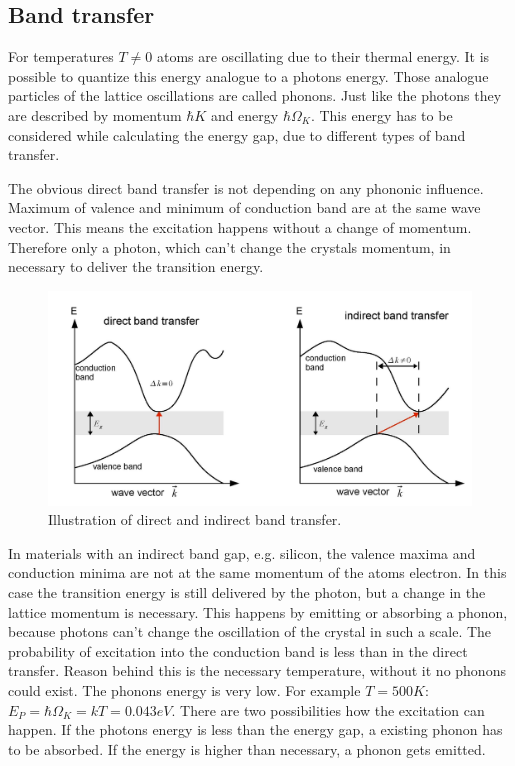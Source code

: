 \documentclass[]{article}
\begin{document}
\subsection{Band transfer}
For temperatures $T\neq 0$ atoms are oscillating due to their thermal energy. It is possible to quantize this energy analogue to a photons energy. Those analogue particles of the lattice oscillations are called phonons. Just like the photons they are described by momentum $\hbar K$ and energy $\hbar \Omega_K$. This energy has to be considered while calculating the energy gap, due to different types of band transfer.

The obvious direct band transfer is not depending on any phononic influence. Maximum of valence and minimum of conduction band are at the same wave vector. This means the excitation happens without a change of momentum. Therefore only a photon, which can't change the crystals momentum, in necessary to deliver the transition energy.

\begin{figure}[H]
\centering
\includegraphics[width=.8\textwidth]{Plots/transfer.png}
\caption{Illustration of direct and indirect band transfer. \cite{wiki}}
\label{fig:band transfer}
\end{figure}

In materials with an indirect band gap, e.g. silicon, the valence maxima and conduction minima are not at the same momentum of the atoms electron. In this case the transition energy is still delivered by the photon, but a change in the lattice momentum is necessary. This happens by emitting or absorbing a phonon, because photons can't change the oscillation of the crystal in such a scale. The probability of excitation into the conduction band is less than in the direct transfer. Reason behind this is the necessary temperature, without it no phonons could exist. The phonons energy is very low. For example $T=500K$: $ E_P= \hbar \Omega_K = kT = 0.043 eV$.
There are two possibilities how the excitation can happen. If the photons energy is less than the energy gap, a existing phonon has to be absorbed. If the energy is higher than necessary, a phonon gets emitted. 
\end{document}
